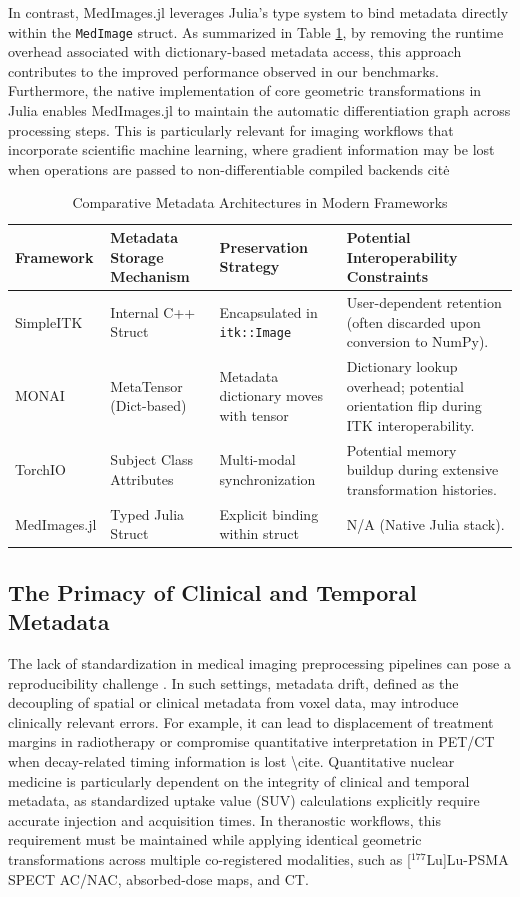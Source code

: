 \documentclass[a4paper,10pt]{elsarticle}
\begin{document}
In contrast, MedImages.jl leverages Julia's type system to bind metadata directly within the \texttt{MedImage} struct. As summarized in Table \ref{tab:metadata_comparison}, by removing the runtime overhead associated with dictionary-based metadata access, this approach contributes to the improved performance observed in our benchmarks. Furthermore, the native implementation of core geometric transformations in Julia enables MedImages.jl to maintain the automatic differentiation graph across processing steps. This is particularly relevant for imaging workflows that incorporate scientific machine learning, where gradient information may be lost when operations are passed to non-differentiable compiled backends cite\. 

\begin{table}[H]
\centering
\caption{Comparative Metadata Architectures in Modern Frameworks}
\begin{tabular}{|p{2.5cm}|p{3.5cm}|p{3.5cm}|p{3.5cm}|}
\hline
\textbf{Framework} & \textbf{Metadata Storage Mechanism} & \textbf{Preservation Strategy} & \textbf{Potential Interoperability Constraints} \\
\hline
SimpleITK & Internal C++ Struct & Encapsulated in \texttt{itk::Image} & User-dependent retention (often discarded upon conversion to NumPy). \\
\hline
MONAI & MetaTensor (Dict-based) & Metadata dictionary moves with tensor & Dictionary lookup overhead; potential orientation flip during ITK interoperability. \\
\hline
TorchIO & Subject Class Attributes & Multi-modal synchronization & Potential memory buildup during extensive transformation histories. \\
\hline
MedImages.jl & Typed Julia Struct & Explicit binding within struct & N/A (Native Julia stack). \\
\hline
\end{tabular}
\label{tab:metadata_comparison}
\end{table}

\subsection*{The Primacy of Clinical and Temporal Metadata}
The lack of standardization in medical imaging preprocessing pipelines can pose a reproducibility challenge \cite{Esteban_2018}. In such settings, metadata drift, defined as the decoupling of spatial or clinical metadata from voxel data, may introduce clinically relevant errors. For example, it can lead to displacement of treatment margins in radiotherapy or compromise quantitative interpretation in PET/CT when decay-related timing information is lost \textbackslash{}cite. Quantitative nuclear medicine is particularly dependent on the integrity of clinical and temporal metadata, as standardized uptake value (SUV) calculations explicitly require accurate injection and acquisition times. In theranostic workflows, this requirement must be maintained while applying identical geometric transformations across multiple co-registered modalities, such as [$^{177}$Lu]Lu-PSMA SPECT AC/NAC, absorbed-dose maps, and CT.
\end{document}
